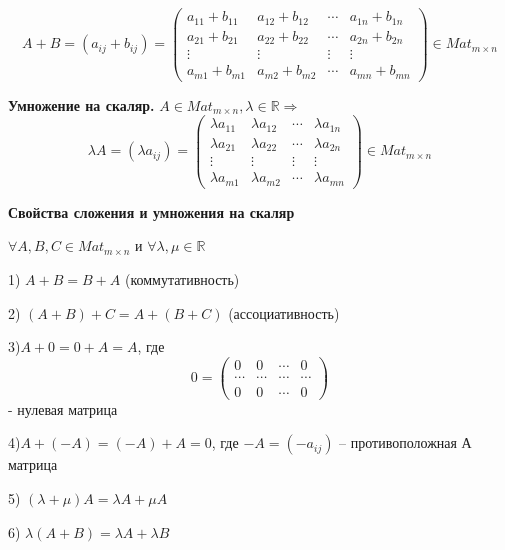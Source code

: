 \begin{equation*}A + B = (a_{ij} + b_{ij}) = 
\begin{pmatrix}
		a_{11} + b_{11} & a_{12} + b_{12} & \cdots & a_{1n} + b_{1n} \\
		a_{21} + b_{21} & a_{22} + b_{22} & \cdots & a_{2n} + b_{2n} \\
       \vdots & \vdots & \vdots& \vdots \\ 
       a_{m1} + b_{m1} & a_{m2} + b_{m2} & \cdots & a_{mn} + b_{mn}
\end{pmatrix} \in Mat_{m\times n}
\end{equation*}

\textbf{Умножение на скаляр.} $A \in Mat_{m\times n}, \lambda \in \mathbb{R} \Rightarrow$
\begin{equation*} \lambda A = (\lambda a_{ij}) = 
\begin{pmatrix}
		\lambda a_{11} & \lambda a_{12} & \cdots & \lambda a_{1n} \\
		\lambda a_{21} & \lambda a_{22} & \cdots & \lambda a_{2n} \\
       \vdots & \vdots & \vdots& \vdots \\ 
       \lambda a_{m1} & \lambda a_{m2} & \cdots & \lambda a_{mn}
\end{pmatrix} \in Mat_{m\times n}
\end{equation*}

\vspace{\baselineskip}
\textbf{Свойства сложения и умножения на скаляр}

$\forall A, B, C \in Mat_{m\times n}$ и $\forall \lambda, \mu \in \mathbb{R}$

1) $A + B = B + A$ (коммутативность)

2) $(A + B) + C = A + (B + C)$ (ассоциативность)

3)$A + 0 = 0 + A = A$, где \begin{equation*}0 = \begin{pmatrix}
0 & 0 & \cdots & 0 \\
\cdots & \cdots & \cdots & \cdots \\
0 & 0 & \cdots & 0
\end{pmatrix} \end{equation*} - нулевая матрица

4)$A + (-A) = (-A) + A = 0$, где $-A = (-a_{ij})$ -- противоположная А матрица 

5) $(\lambda + \mu)A = \lambda A + \mu A$

6) $\lambda (A + B) = \lambda A + \lambda B$

